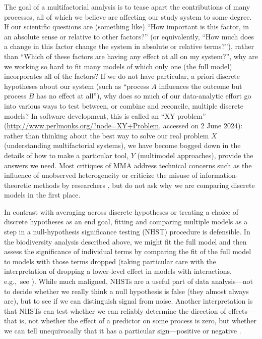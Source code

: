 \documentclass[entropy,article,accept,pdftex,moreauthors]{Definitions/mdpi}
\begin{document}
The goal of a multifactorial analysis is to tease apart the
contributions of many processes, all of which we believe are
affecting our study system to some degree. If our scientific questions
are (something like) ``How important is this factor, in an absolute
sense or relative to other factors?'' (or equivalently, ``How much does
a change in this factor change the system in absolute or relative
terms?''), rather than ``Which of these factors are having {any
effect at all} on my system?'', why are we working so hard to fit many
models of which only one (the full model) incorporates all of the
factors? If we do not have particular, {a priori} discrete
hypotheses about our system (such as ``process \(A\) influences the
outcome but process \(B\) has no effect at all''), why does so much of
our data-analytic effort go into various ways to test between, or
combine and reconcile, multiple discrete models? In software
development, this is called an ``XY problem'' (\url{http://www.perlmonks.org/?node=XY+Problem}, accessed on 2 June 2024): %
rather than thinking about the best way to solve our real problem \(X\)
(understanding multifactorial systems), we have become bogged down in
the details of how to make a particular tool, \(Y\) (multimodel
approaches), provide the answers we need. %
Most critiques of MMA address
technical concerns such as the influence of unobserved heterogeneity
\cite{ref-brewer_relative_2016}
or criticize the misuse of
information-theoretic methods by researchers \cite{ref-mundryIssues2011,ref-cade_model_2015},
but do not ask why we are comparing discrete models in the first place.

In contrast with averaging across discrete hypotheses or treating a
choice of discrete hypotheses as an end goal, fitting and comparing
multiple models as a step in a null-hypothesis significance testing
(NHST) procedure is defensible. In the biodiversity analysis described
above, we might fit the full model and then assess the significance of
individual terms by comparing the fit of the full model to models with
those terms dropped (taking particular care with the interpretation of
dropping a lower-level effect in models with interactions, e.g.,~see
\cite{ref-bernhardtInterpretation1979}). While much maligned, NHSTs are a useful part
of data analysis---not to decide whether we really think a null
hypothesis is false (they almost always are), but to see if we can
distinguish signal from noise. Another interpretation is that NHSTs can
test whether we can reliably determine the direction of effects---that is, not whether the effect of a predictor on some process is
zero, but whether we can tell unequivocally that it has a particular
sign---positive or negative \cite{ref-jones_sensible_2000,ref-dushoff_i_2019}.
\end{document}
